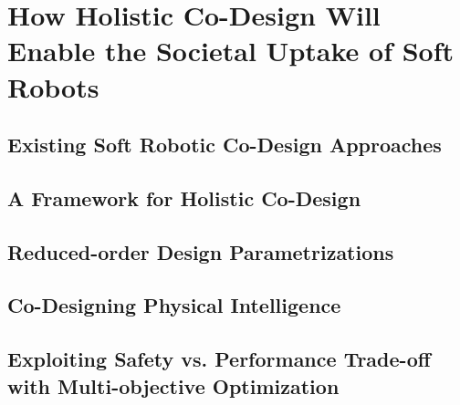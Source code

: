 \chapter{How Holistic Co-Design Will Enable the Societal Uptake of Soft Robots}\label{chp:apx:towardscodesign}
\section{Existing Soft Robotic Co-Design Approaches}
\section{A Framework for Holistic Co-Design}
\section{Reduced-order Design Parametrizations}
\section{Co-Designing Physical Intelligence}
\section{Exploiting Safety vs. Performance Trade-off with Multi-objective Optimization}